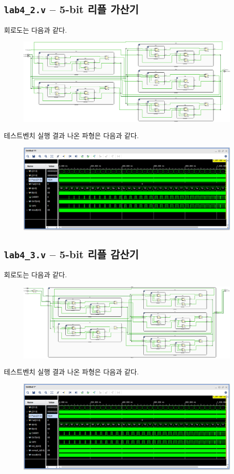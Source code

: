 \documentclass{scrartcl}
\begin{document}
\subsection{\texttt{lab4\_2.v} -- 5-bit 리플 가산기}
회로도는 다음과 같다.
\begin{figure}[H]
  \centering
  \includegraphics[width=0.9\linewidth]{lab4_2_schematic-crop.pdf}
\end{figure}
테스트벤치 실행 결과 나온 파형은 다음과 같다.
\begin{figure}[H]
  \centering
  \includegraphics[width=0.9\linewidth]{lab4_2_waveform.png}
\end{figure}

\subsection{\texttt{lab4\_3.v} -- 5-bit 리플 감산기}
회로도는 다음과 같다.
\begin{figure}[H]
  \centering
  \includegraphics[width=0.9\linewidth]{lab4_3_schematic-crop.pdf}
\end{figure}
테스트벤치 실행 결과 나온 파형은 다음과 같다.
\begin{figure}[H]
  \centering
  \includegraphics[width=0.9\linewidth]{lab4_3_waveform.png}
\end{figure}
\end{document}
